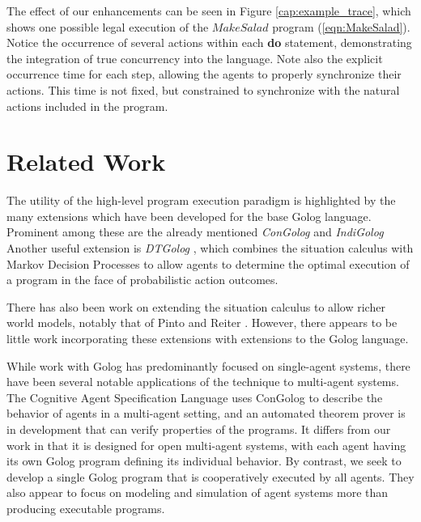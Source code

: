 \documentclass{llncs}
\begin{document}
The effect of our enhancements can be seen in Figure
\ref{cap:example_trace}, which shows one possible legal execution of the
$MakeSalad$ program (\ref{eqn:MakeSalad}). Notice the occurrence of several
actions within each \textbf{do} statement, demonstrating the integration
of true concurrency into the language.
Note also the explicit occurrence time for
each step, allowing the agents to properly synchronize their actions.
This time is not fixed, but constrained to synchronize with the natural
actions included in the program.

\section{Related Work}

The utility of the high-level program execution paradigm is highlighted
by the many extensions which have been developed for the base Golog
language. Prominent among these are the already mentioned \emph{ConGolog}
\cite{giacomo00congolog} and 
\emph{IndiGolog} \cite{giacomo99indigolog}
Another useful extension is \emph{DTGolog} \cite{boutilier00dtgolog}, which
combines the situation calculus with Markov Decision Processes to
allow agents to determine the optimal execution of a program in the face
of probabilistic action outcomes.

There has also been work on extending the situation calculus to allow
richer world models, notably that of Pinto \cite{pinto94temporal}
and Reiter \cite{reiter96sc_nat_conc}. 
However, there appears to be little work incorporating these
extensions with extensions to the Golog language.

While work with Golog has predominantly focused on single-agent systems,
there have been several notable applications of the technique to multi-agent
systems. The Cognitive Agent Specification Language \cite{shapiro02casl}
uses ConGolog to describe the behavior of agents in a multi-agent
setting, and an automated theorem prover is in development that can
verify properties of the programs. It differs from our work in that
it is designed for open multi-agent systems, with each agent having
its own Golog program defining its individual behavior. By contrast, we seek
to develop a single Golog program that is cooperatively executed by
all agents. They also appear to focus on modeling and simulation
of agent systems more than producing executable programs.
\end{document}
